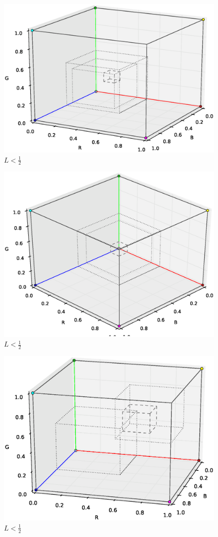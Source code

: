 \documentclass[a4paper,11pt]{jsarticle}
\numberwithin{theorem}{section}  %
\numberwithin{equation}{section} %
\begin{document}
\begin{figure}[H]
\includegraphics[width=12cm]{p3_1a.ps}
\caption{$L<\frac{1}{2}$}
\end{figure}
\begin{figure}[H]
\includegraphics[width=12cm]{p3_1b.ps}
\caption{$L<\frac{1}{2}$}
\end{figure}
\begin{figure}[H]
\includegraphics[width=12cm]{p3_2a.ps}
\caption{$L<\frac{1}{2}$}
\end{figure}
\end{document}
